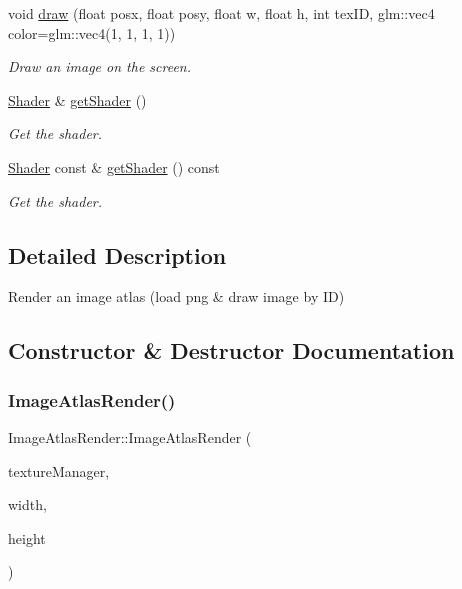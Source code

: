 \begin{DoxyCompactItemize}
void \hyperlink{class_image_atlas_render_af663fd9ccfb255a56835a11dfa549eea}{draw} (float posx, float posy, float w, float h, int tex\+ID, glm\+::vec4 color=glm\+::vec4(1, 1, 1, 1))
\begin{DoxyCompactList}\small\item\em Draw an image on the screen. \end{DoxyCompactList}\item 
\hyperlink{class_shader}{Shader} \& \hyperlink{class_image_atlas_render_aba25059e07e686b04ccbf5840790849d}{get\+Shader} ()
\begin{DoxyCompactList}\small\item\em Get the shader. \end{DoxyCompactList}\item 
\hyperlink{class_shader}{Shader} const  \& \hyperlink{class_image_atlas_render_a4c72d64708b498abcddfb27c9851503c}{get\+Shader} () const
\begin{DoxyCompactList}\small\item\em Get the shader. \end{DoxyCompactList}\end{DoxyCompactItemize}


\subsection{Detailed Description}
Render an image atlas (load png \& draw image by ID) 

\subsection{Constructor \& Destructor Documentation}
\mbox{\label{class_image_atlas_render_a0ae44d3e6a32ca9c6c1134a48bf882ad}} 
\subsubsection{\texorpdfstring{Image\+Atlas\+Render()}{ImageAtlasRender()}\hspace{0.1cm}{\footnotesize\ttfamily [1/2]}}
{\footnotesize\ttfamily Image\+Atlas\+Render\+::\+Image\+Atlas\+Render (\begin{DoxyParamCaption}\item[{\hyperlink{class_texture_manager}{Texture\+Manager} const \&}]{texture\+Manager,  }\item[{uint32\+\_\+t}]{width,  }\item[{uint32\+\_\+t}]{height }\end{DoxyParamCaption})}



